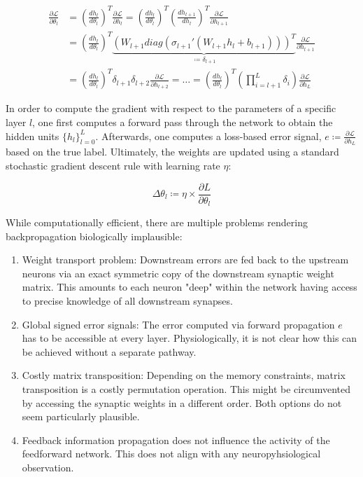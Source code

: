 \documentclass[colorinlistoftodos]{article}
\theoremstyle{definition}
\begin{document}
\begin{align*}
	\frac{\partial \mathcal{L}}{\partial \theta_l} &= \left(\frac{dh_{l}}{d \theta_{l}}\right)^T \frac{\partial \mathcal{L}}{\partial h_{l}} = \left(\frac{dh_{l}}{d \theta_{l}}\right)^T \left(\frac{dh_{l+1}}{d h_{l}}\right)^T \frac{\partial \mathcal{L}}{\partial h_{l+1}} \\ 
	&=  \left(\frac{dh_{l}}{d \theta_{l}}\right)^T \underbrace{\left(W_{l+1} diag\left(\sigma_{l+1}'(W_{l+1}h_l +b_{l+1})\right)\right)^T}_{\coloneqq \delta_{l+1}} \frac{\partial \mathcal{L}}{\partial h_{l+1}} \\
	&= \left(\frac{dh_{l}}{d \theta_{l}}\right)^T \delta_{l+1} \delta_{l+2}\frac{\partial \mathcal{L}}{\partial h_{l+2}} = \dots =  \left(\frac{dh_{l}}{d \theta_{l}}\right)^T \left(\prod_{i=l+1}^L \delta_i\right) \frac{\partial \mathcal{L}}{\partial h_{L}}
\end{align*}

In order to compute the gradient with respect to the parameters of a specific layer $l$, one first computes a forward pass through the network to obtain the hidden units $\{h_l\}_{l=0}^L$. Afterwards, one computes a loss-based error signal, $e \coloneqq \frac{\partial \mathcal{L}}{\partial h_{L}}$ based on the true label. Ultimately, the weights are updated using a standard stochastic gradient descent rule with learning rate $\eta$:

$$\Delta \theta_l \coloneqq \eta \times \frac{\partial L}{\partial \theta_l}$$

While computationally efficient, there are multiple problems rendering backpropagation biologically implausible: 

\begin{enumerate}
	\item Weight transport problem: Downstream errors are fed back to the upstream neurons via an exact symmetric copy of the downstream synaptic weight matrix. This amounts to each neuron "deep" within the network having access to precise knowledge of all downstream synapses.
	\item Global signed error signals: The error computed via forward propagation $e$ has to be accessible at every layer. Physiologically, it is not clear how this can be achieved without a separate pathway.
	\item Costly matrix transposition: Depending on the memory constraints, matrix transposition is a costly permutation operation. This might be circumvented by accessing the synaptic weights in a different order. Both options do not seem particularly plausible.
	\item Feedback information propagation does not influence the activity of the feedforward network. This does not align with any neuropyhsiological observation.
\end{enumerate}
\end{document}
